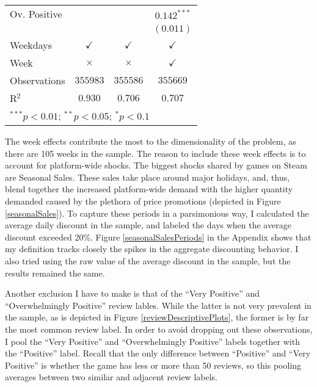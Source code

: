 \documentclass[12pt,pagebackref]{article}
\begin{document}
\begin{table}
\begin{center}
\begin{tabular}{l c c c}
Ov. Positive  &                &                & $0.142^{***}$  \\
              &                &                & $(0.011)$      \\
\hline
Weekdays      & $\checkmark$        & $\checkmark$        & $\checkmark$        \\
Week          & $\times$        & $\times$        & $\checkmark$        \\
Observations  & $355983$   & $355586$   & $355669$   \\
R$^2$         & $0.930$        & $0.706$        & $0.707$        \\
\hline
\multicolumn{4}{l}{\scriptsize{$^{***}p<0.01$; $^{**}p<0.05$; $^{*}p<0.1$}}
\end{tabular}
\label{demandEstimates}
\end{center}
\end{table}

The week effects contribute the most to the dimensionality of the
problem, as there are 105 weeks in the sample. The reason to include
these week effects is to account for platform-wide shocks. The biggest
shocks shared by games on Steam are Seasonal Sales. These sales take
place around major holidays, and, thus, blend together the increased
platform-wide demand with the higher quantity demanded caused by the
plethora of price promotions (depicted in Figure \ref{seasonalSales}).
To capture these periods in a parsimonious way, I calculated the average
daily discount in the sample, and labeled the days when the average
discount exceeded 20\%. Figure \ref{seasonalSalesPeriods} in the
Appendix shows that my definition tracks closely the spikes in the
aggregate discounting behavior. I also tried using the raw value of the
average discount in the sample, but the results remained the same.

Another exclusion I have to make is that of the ``Very Positive'' and
``Overwhelmingly Positive'' review lables. While the latter is not very
prevalent in the sample, as is depicted in Figure
\ref{reviewDescriptivePlots}, the former is by far the most common
review label. In order to avoid dropping out these observations, I pool
the ``Very Positive'' and ``Overwhelmingly Positive'' labels together
with the ``Positive'' label. Recall that the only difference between
``Positive'' and ``Very Positive'' is whether the game has less or more
than 50 reviews, so this pooling averages between two similar and
adjacent review labels.
\end{document}

